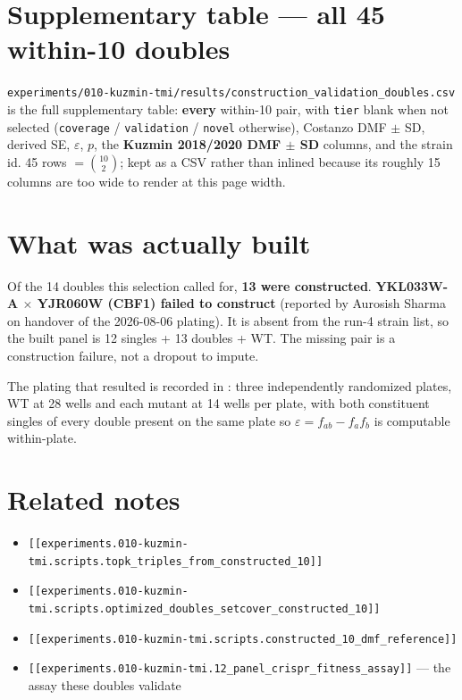 \section{Supplementary table --- all 45 within-10 doubles}
\label{sec:si-table}

\texttt{experiments/010-kuzmin-tmi/results/construction\_validation\_doubles.csv} is the full
supplementary table: \textbf{every} within-10 pair, with \texttt{tier} blank when not selected
(\texttt{coverage} / \texttt{validation} / \texttt{novel} otherwise), Costanzo DMF $\pm$ SD,
derived SE, $\varepsilon$, $p$, the \textbf{Kuzmin 2018/2020 DMF $\pm$ SD} columns, and the
strain id. 45 rows $=\binom{10}{2}$; kept as a CSV rather than inlined because its roughly 15
columns are too wide to render at this page width.

\section{What was actually built}

Of the 14 doubles this selection called for, \textbf{13 were constructed}.
\textbf{YKL033W-A $\times$ YJR060W (CBF1) failed to construct} (reported by Aurosish Sharma on
handover of the 2026-08-06 plating). It is absent from the run-4 strain list, so the built
panel is 12 singles + 13 doubles + WT. The missing pair is a construction failure, not a
dropout to impute.

The plating that resulted is recorded in
:
three independently randomized plates, WT at 28 wells and each mutant at 14 wells per plate,
with both constituent singles of every double present on the same plate so
$\varepsilon = f_{ab} - f_a f_b$ is computable within-plate.

\section{Related notes}

\begin{itemize}
  \item \texttt{[[experiments.010-kuzmin-tmi.scripts.topk\_triples\_from\_constructed\_10]]}
  \item \texttt{[[experiments.010-kuzmin-tmi.scripts.optimized\_doubles\_setcover\_constructed\_10]]}
  \item \texttt{[[experiments.010-kuzmin-tmi.scripts.constructed\_10\_dmf\_reference]]}
  \item \texttt{[[experiments.010-kuzmin-tmi.12\_panel\_crispr\_fitness\_assay]]} --- the assay
        these doubles validate
\end{itemize}
